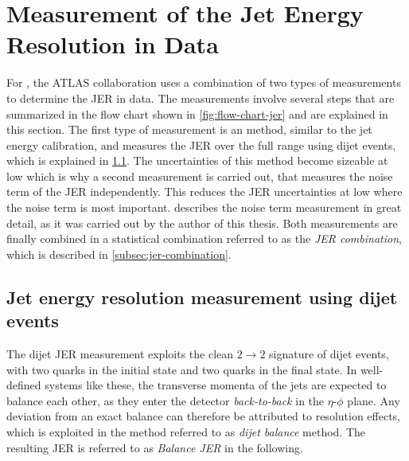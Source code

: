 \section{Measurement of the Jet Energy Resolution in Data}
\label{sec:jer-measurement}
For \RunTwo, the ATLAS collaboration uses a combination of two types of measurements to determine the JER in data. The measurements involve several steps that are summarized in the flow chart shown in \cref{fig:flow-chart-jer} and are explained in this section.
The first type of measurement is an \insitu method, similar to the \insitu jet energy calibration, and measures the JER over the full \pT range using dijet events, which is explained in \cref{subsec:dijet-balance}. The uncertainties of this method become sizeable at low \pT which is why a second measurement is carried out, that measures the noise term of the JER independently. This reduces the JER uncertainties at low \pT where the noise term is most important.  describes the noise term measurement in great detail, as it was carried out by the author of this thesis.
Both measurements are finally combined in a statistical combination referred to as the \emph{JER combination}, which is described in \cref{subsec:jer-combination}.

\subsection{Jet energy resolution measurement using dijet events}
\label{subsec:dijet-balance}
The dijet \insitu JER measurement exploits the clean $2 \rightarrow 2$ signature of dijet events, with two quarks in the initial state and two quarks in the final state. In well-defined systems like these, the transverse momenta of the jets are expected to balance each other, as they enter the detector \emph{back-to-back} in the $\eta$-$\phi$ plane. Any deviation from an exact balance can therefore be attributed to resolution effects, which is exploited in the method referred to as \emph{dijet balance} method. The resulting JER is referred to as \emph{Balance JER} in the following.

